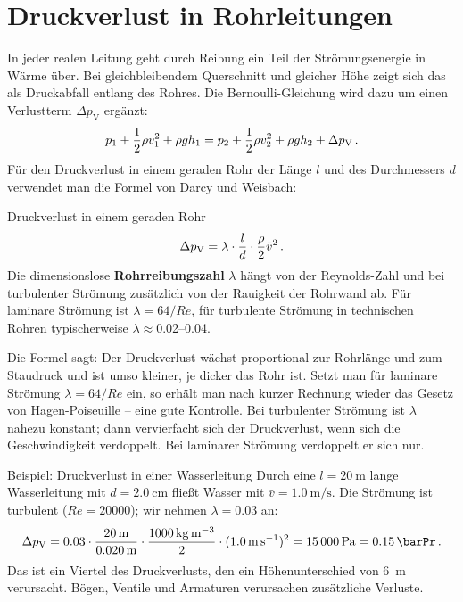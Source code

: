 \section{Druckverlust in Rohrleitungen}\label{sec: druckverlust_rohr}
In jeder realen Leitung geht durch Reibung ein Teil der Strömungsenergie in Wärme über. Bei gleichbleibendem Querschnitt und gleicher Höhe zeigt sich das als Druckabfall entlang des Rohres. Die Bernoulli-Gleichung wird dazu um einen Verlustterm $\Delta p_\text{V}$ ergänzt:
\begin{equation}\label{eq: bernoulli_mit_verlust}
    p_1 + \frac{1}{2}\rho v_1^2 + \rho g h_1 = p_2 + \frac{1}{2}\rho v_2^2 + \rho g h_2 + \Delta p_\text{V} \,.
\end{equation}
Für den Druckverlust in einem geraden Rohr der Länge $l$ und des Durchmessers $d$ verwendet man die Formel von Darcy und Weisbach:
\begin{importantbox}[]{Druckverlust in einem geraden Rohr}
    \begin{equation}\label{eq: darcy_weisbach}
        \Delta p_\text{V} = \lambda \cdot \frac{l}{d} \cdot \frac{\rho}{2} \bar{v}^2 \,.
    \end{equation}
    Die dimensionslose \textbf{Rohrreibungszahl} $\lambda$ hängt von der Reynolds-Zahl und bei turbulenter Strömung zusätzlich von der Rauigkeit der Rohrwand ab. Für laminare Strömung ist $\lambda = 64/\mathit{Re}$, für turbulente Strömung in technischen Rohren typischerweise $\lambda \approx {}$\numrange{0.02}{0.04}.
\end{importantbox}
Die Formel sagt: Der Druckverlust wächst proportional zur Rohrlänge und zum Staudruck und ist umso kleiner, je dicker das Rohr ist. Setzt man für laminare Strömung $\lambda = 64/\mathit{Re}$ ein, so erhält man nach kurzer Rechnung wieder das Gesetz von Hagen-Poiseuille -- eine gute Kontrolle. Bei turbulenter Strömung ist $\lambda$ nahezu konstant; dann vervierfacht sich der Druckverlust, wenn sich die Geschwindigkeit verdoppelt. Bei laminarer Strömung verdoppelt er sich nur.

\begin{examplebox}[]{Beispiel: Druckverlust in einer Wasserleitung}
    Durch eine $l = \SI{20}{\meter}$ lange Wasserleitung mit $d = \SI{2.0}{\centi\meter}$ fließt Wasser mit $\bar{v} = \SI{1.0}{\meter\per\second}$. Die Strömung ist turbulent ($\mathit{Re} = \num{20000}$); wir nehmen $\lambda = \num{0.03}$ an:
    \begin{equation*}
        \Delta p_\text{V} = \num{0.03} \cdot \frac{\SI{20}{\meter}}{\SI{0.020}{\meter}} \cdot \frac{\SI{1000}{\kilogram\per\meter\cubed}}{2} \cdot (\SI{1.0}{\meter\per\second})^2 = \SI{15000}{\pascal} = \SI{0.15}{\barPr} \mDot
    \end{equation*}
    Das ist ein Viertel des Druckverlusts, den ein Höhenunterschied von \SI{6}{\meter} verursacht. Bögen, Ventile und Armaturen verursachen zusätzliche Verluste.
\end{examplebox}

